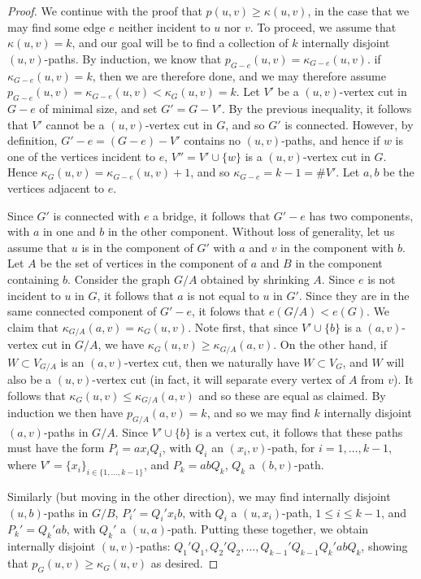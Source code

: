 \documentclass[12pt]{report}
\theoremstyle{plain}
\begin{document}
\begin{proof}
We continue with the proof that $p(u, v) \geq \kappa(u, v)$, in the case
that we may find some edge $e$ neither incident to $u$ nor $v$. To proceed,
we assume that $\kappa(u, v) = k$, and our goal will be to find a
collection of $k$ internally disjoint $(u, v)$-paths. By induction, we know
that $p_{G - e}(u, v) = \kappa_{G - e}(u, v)$. if $\kappa_{G - e}(u, v) =
k$, then we are therefore done, and we may therefore assume $p_{G - e}(u,
v) = \kappa_{G - e}(u, v) < \kappa_G(u, v) = k$. Let $V'$ be a $(u,
v)$-vertex cut in $G - e$ of minimal size, and set $G' = G - V'$. By the
previous inequality, it follows that $V'$ cannot be a $(u, v)$-vertex cut
in $G$, and so $G'$ is connected. However, by definition, $G' - e = (G - e)
- V'$ contains no $(u, v)$-paths, and hence if $w$ is one of the vertices
incident to $e$, $V'' = V' \cup \{w\}$ is a $(u, v)$-vertex cut in $G$.
Hence $\kappa_G(u, v) = \kappa_{G - e}(u, v) + 1$, and so $\kappa_{G - e} =
k - 1 = \#V'$. Let $a, b$ be the vertices adjacent to $e$. 

Since $G'$ is connected with $e$ a bridge, it follows that $G' - e$ has two
components, with $a$ in one and $b$ in the other component. Without loss of
generality, let us assume that $u$ is in the component of $G'$ with $a$ and
$v$ in the component with $b$. Let $A$ be the set of vertices in the
component of $a$ and $B$ in the component containing $b$. Consider the
graph $G/A$ obtained by shrinking $A$. Since $e$ is not incident to $u$ in
$G$, it follows that $a$ is not equal to $u$ in $G'$. Since they are in the
same connected component of $G' - e$, it folows that $e(G/A) < e(G)$. We
claim that $\kappa_{G/A}(a, v)= \kappa_{G}(u, v)$. Note first, that since
$V' \cup \{b\}$ is a $(a, v)$-vertex cut in $G/A$, we have $\kappa_G(u, v)
\geq \kappa_{G/A}(a, v)$. On the other hand, if $W \subset V_{G/A}$ is an
$(a, v)$-vertex cut, then we naturally have $W \subset V_G$, and $W$ will
also be a $(u, v)$-vertex cut (in fact, it will separate every vertex of
$A$ from $v$). It follows that $\kappa_G(u, v) \leq \kappa_{G/A}(a, v)$ and
so these are equal as claimed. By induction we then have $p_{G/A}(a, v) =
k$, and so we may find $k$ internally disjoint $(a, v)$-paths in $G/A$.
Since $V' \cup \{b\}$ is a vertex cut, it follows that these paths must
have the form $P_i = a x_i Q_i$, with $Q_i$ an $(x_i, v)$-path, for $i = 1,
\ldots, k-1$, where $V' = \{x_i\}_{i \in \{1, \ldots, k-1\}}$, and $P_k =
abQ_k$, $Q_k$ a $(b, v)$-path.

Similarly (but moving in the other direction), we may find internally
disjoint $(u, b)$-paths in $G/B$, $P_i' = Q_i' x_i b$, with $Q_i$ a $(u,
x_i)$-path, $1 \leq i \leq k-1$, and $P_k' = Q_k' ab$, with $Q_k'$ a $(u,
a)$-path. Putting these together, we obtain internally disjoint $(u,
v)$-paths: $Q_1' Q_1, Q_2' Q_2, \ldots, Q_{k-1}' Q_{k-1} Q_k' ab Q_k$,
showing that $p_G(u, v) \geq \kappa_G(u, v)$ as desired.
\end{proof}
\end{document}
